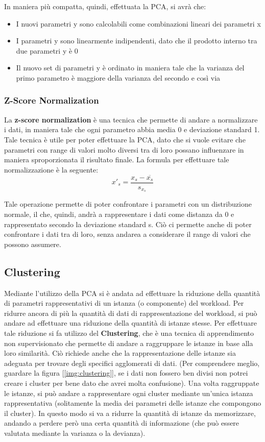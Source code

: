 In maniera più compatta, quindi, effettuata la PCA, si avrà che:
\begin{itemize}
    \item I nuovi parametri y sono calcolabili come combinazioni lineari dei parametri x
    \item I parametri y sono linearmente indipendenti, dato che il prodotto interno tra due parametri y è 0
    \item Il nuovo set di parametri y è ordinato in maniera tale che la varianza del primo parametro è maggiore della varianza del secondo e così via
\end{itemize}

\subsubsection{Z-Score Normalization}
La \textbf{z-score normalization} è una tecnica che permette di andare a normalizzare i dati, in maniera tale che ogni parametro abbia media 0 e deviazione standard 1. Tale tecnica è utile per poter effettuare la PCA, dato che si vuole evitare che parametri con range di valori molto diversi tra di loro possano influenzare in maniera sproporzionata il risultato finale. La formula per effettuare tale normalizzazione è la seguente:
\[
x'_s = \frac{x_{s} - \overline{x_s}}{s_{x_s}}
\]

Tale operazione permette di poter confrontare i parametri con un distribuzione normale, il che, quindi, andrà a rappresentare i dati come distanza da 0 e rappresentato secondo la deviazione standard s. Ciò ci permette anche di poter confrontare i dati tra di loro, senza andarea a considerare il range di valori che possono assumere.

\subsection{Clustering}
Mediante l'utilizzo della PCA si è andata ad effettuare la riduzione della quantità di parametri rappresentativi di un istanza (o componente) del workload. Per ridurre ancora di più la quantità di dati di rappresentazione del workload, si può andare ad effettuare una riduzione della quantità di istanze stesse. Per effettuare tale riduzione si fa utilizzo del \textbf{Clustering}, che è una tecnica di apprendimento non supervisionato che permette di andare a raggruppare le istanze in base alla loro similarità. Ciò richiede anche che la rappresentazione delle istanze sia adeguata per trovare degli specifici agglomerati di dati. (Per comprendere meglio, guardare la figura [\ref{img:clustering}], se i dati non fossero ben divisi non potrei creare i cluster per bene dato che avrei molta confusione). Una volta raggruppate le istanze, si può andare a rappresentare ogni cluster mediante un'unica istanza rappresentativa (solitamente la media dei parametri delle istanze che compongono il cluster). In questo modo si va a ridurre la quantità di istanze da memorizzare, andando a perdere però una certa quantità di informazione (che può essere valutata mediante la varianza o la devianza).

